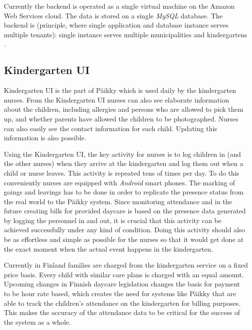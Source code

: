 Currently the backend is operated as a single virtual machine on the Amazon Web Services cloud. The data is stored on a single \textit{MySQL} database. The backend is  (principle, where single application and database instance serves multiple tenants): single instance serves multiple municipalities and kindergartens \cite{bezemer_multi-tenant_2010}.






\subsection{Kindergarten UI}

Kindergarten UI is the part of Päikky which is used daily by the kindergarten nurses. From the Kindergarten UI nurses can also see elaborate information about the children, including allergies and persons who are allowed to pick them up, and whether parents have allowed the children to be photographed. Nurses can also easily see the contact information for each child. Updating this information is also possible. %

Using the Kindergarten UI, the key activity for nurses is to log children in (and the other nurses) when they arrive at the kindergarten and log them out when a child or nurse leaves. This activity is repeated tens of times per day. To do this conveniently nurses are equipped with \textit{Android} smart phones. The marking of goings and leavings has to be done in order to replicate the presence status from the real world to the Päikky system. Since monitoring attendance and in the future creating bills for provided daycare is based on the presence data generated by logging the personnel in and out, it is crucial that this activity can be achieved successfully under any kind of condition. Doing this activity should also be as effortless and simple as possible for the nurses so that it would get done at the exact moment when the actual event happens in the kindergarten. 

Currently in Finland families are charged from the kindergarten service on a fixed price basis. Every child with similar care plans is charged with an equal amount. Upcoming changes in Finnish daycare legislation changes the basis for payment to be hour rate based, which creates the need for systems like Päikky that are able to track the children's attendance on the kindergarten for billing purposes. This makes the accuracy of the attendance data to be critical for the success of the system as a whole. %

